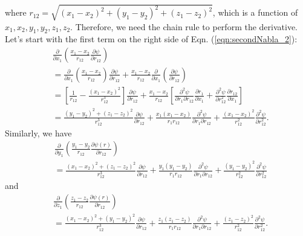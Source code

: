 where $r_{12}=\sqrt{(x_1-x_2)^2+(y_1-y_2)^2+(z_1-z_2)^2}$, which is a function of $x_1, x_2, y_1, y_2, z_1, z_2$. Therefore, we need the chain rule to perform the derivative. Let's start with the first term on the right side of Eqn. (\ref{eqn:secondNabla_2}):
\begin{equation}
    \begin{split}
        &\frac{\partial}{\partial x_1}\left(\frac{x_1-x_2}{r_{12}}\frac{\partial\psi}{\partial r_{12}}\right)  \\
        &=\frac{\partial}{\partial x_1}\left(\frac{x_1-x_2}{r_{12}}\right)\frac{\partial\psi}{\partial r_{12}}+\frac{x_1-x_2}{r_{12}}\frac{\partial}{\partial x_1}\left(\frac{\partial\psi}{\partial r_{12}}\right) \\
        &=\left[\frac{1}{r_{12}}-\frac{(x_1-x_2)^2}{r_{12}^3}\right]\frac{\partial\psi}{\partial r_{12}}+\frac{x_1-x_2}{r_{12}}\left[\frac{\partial^2\psi}{\partial r_1\partial r_{12}}\frac{\partial r_1}{\partial x_1}+\frac{\partial^2\psi}{\partial r_{12}^2}\frac{\partial r_{12}}{\partial x_1}\right] \\
        &=\frac{(y_1-y_2)^2+(z_1-z_2)^2}{r_{12}^3}\frac{\partial\psi}{\partial r_{12}}+\frac{x_1(x_1-x_2)}{r_1r_{12}}\frac{\partial^2\psi}{\partial r_1\partial r_{12}}+\frac{(x_1-x_2)^2}{r_{12}^2}\frac{\partial^2\psi}{\partial r^2_{12}}.
    \end{split}
    \label{eqn:A_11_1}
\end{equation}
Similarly, we have
\begin{equation}
    \begin{split}
        &\frac{\partial}{\partial y_1}\left(\frac{y_1-y_2}{r_{12}}\frac{\partial\psi(r)}{\partial r_{12}}\right) \\
        &=\frac{(x_1-x_2)^2+(z_1-z_2)^2}{r_{12}^3}\frac{\partial\psi}{\partial r_{12}}+\frac{y_1(y_1-y_2)}{r_1r_{12}}\frac{\partial^2\psi}{\partial r_1\partial r_{12}}+\frac{(y_1-y_2)^2}{r_{12}^2}\frac{\partial^2\psi}{\partial r^2_{12}}
    \end{split}
    \label{eqn:A_11_2}
\end{equation}
and
\begin{equation}
    \begin{split}
        &\frac{\partial}{\partial z_1}\left(\frac{z_1-z_2}{r_{12}}\frac{\partial\psi(r)}{\partial r_{12}}\right) \\
        &=\frac{(x_1-x_2)^2+(y_1-y_2)^2}{r_{12}^3}\frac{\partial\psi}{\partial r_{12}}+\frac{z_1(z_1-z_2)}{r_1r_{12}}\frac{\partial^2\psi}{\partial r_1\partial r_{12}}+\frac{(z_1-z_2)^2}{r_{12}^2}\frac{\partial^2\psi}{\partial r^2_{12}}.
    \end{split}
    \label{eqn:A_11_3}
\end{equation}

